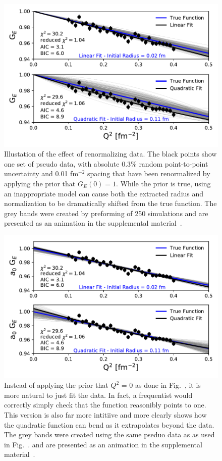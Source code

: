 \documentclass[10pt,aps,prc,twocolumn]{revtex4-1}
\begin{document}
\begin{figure}[htb]
\includegraphics[width=\columnwidth]{Figure/linearVSquadratic-band.pdf}
\caption{Illustation of the effect of renormalizing data.  The
black points show one set of pseudo data, with absolute 0.3\% random point-to-point 
uncertainty and 0.01 fm$^{-2}$ spacing that have been renormalized
by applying the prior that $G_E(0)=1$.    While the prior is true, using an inappropriate model
can cause both the extracted radius and normalization to be dramatically shifted from the true
function.   
The grey bands were created by preforming of 250 simulations and are presented as
an animation in the supplemental material~\cite{Supplement}.}
\label{linearVSquadratic}
\end{figure}

\begin{figure}[htb]
\includegraphics[width=\columnwidth]{Figure/frequentist-band.pdf}
\caption{Instead of applying the prior that $Q^2$ = 0 as done in Fig.~\cite{linearVSquadratic}, it is more natural to
just fit the data.  In fact, a frequentist would correctly simply check that the function reasonibly points to one.
This version is also far more intitiive and more clearly shows how the quadratic function can bend as it extrapolates 
beyond the data.   
The grey bands were created using the same pseduo data as
as used in Fig.~\cite{linearVSquadratic}. 
and are presented as
an animation in the supplemental material~\cite{Supplement}. }
\end{figure}
\end{document}
